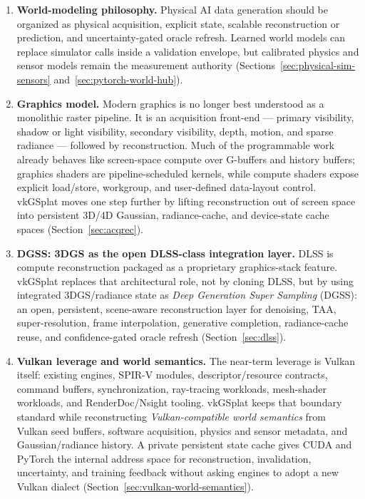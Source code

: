 \documentclass[10pt,journal,onecolumn]{IEEEtran}
\begin{document}
\begin{enumerate}
    \item \textbf{World-modeling philosophy.} Physical AI data generation
    should be organized as physical acquisition, explicit state, scalable
    reconstruction or prediction, and uncertainty-gated oracle refresh. Learned
    world models can replace simulator calls inside a validation envelope, but
    calibrated physics and sensor models remain the measurement authority
    (Sections~\ref{sec:physical-sim-sensors} and~\ref{sec:pytorch-world-hub}).

    \item \textbf{Graphics model.} Modern graphics is no longer best
    understood as a monolithic raster pipeline. It is an acquisition
    front-end --- primary visibility, shadow or light visibility,
    secondary visibility, depth, motion, and sparse radiance --- followed
    by reconstruction. Much of the programmable work already behaves like
    screen-space compute over G-buffers and history buffers; graphics shaders
    are pipeline-scheduled kernels, while compute shaders expose explicit
    load/store, workgroup, and user-defined data-layout control. vkGSplat moves
    one step further by lifting reconstruction out of screen space into
    persistent 3D/4D Gaussian, radiance-cache, and device-state cache spaces
    (Section~\ref{sec:acqrec}).

    \item \textbf{DGSS: 3DGS as the open DLSS-class integration layer.}
    DLSS is compute reconstruction packaged as a proprietary graphics-stack
    feature. vkGSplat replaces that architectural role, not by cloning DLSS,
    but by using integrated 3DGS/radiance state as \emph{Deep Generation Super
    Sampling} (DGSS): an open, persistent, scene-aware reconstruction layer for
    denoising, TAA, super-resolution, frame interpolation, generative completion,
    radiance-cache reuse, and confidence-gated oracle refresh
    (Section~\ref{sec:dlss}).

    \item \textbf{Vulkan leverage and world semantics.} The near-term leverage
    is Vulkan itself: existing engines, SPIR-V modules, descriptor/resource
    contracts, command buffers, synchronization, ray-tracing workloads,
    mesh-shader workloads, and RenderDoc/Nsight tooling. vkGSplat keeps that boundary
    standard while reconstructing \emph{Vulkan-compatible world semantics} from
    Vulkan seed buffers, software acquisition, physics and sensor metadata, and
    Gaussian/radiance history. A private persistent state cache gives CUDA and
    PyTorch the internal address space for reconstruction, invalidation,
    uncertainty, and training feedback without asking engines to adopt a new
    Vulkan dialect (Section~\ref{sec:vulkan-world-semantics}).


\end{enumerate}
\end{document}
